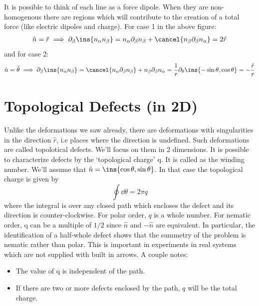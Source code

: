 It is possible to think of each line as a force dipole. When they are non-homogenous there are regions which will contribute to the creation of a total force (like electric dipoles and charge). For case 1 in the above figure:
\begin{align}
    \hat{n} = \hat{r} \implies \partial_\beta\ins{n_\alpha n_\beta} = n_\alpha\partial_\beta n_\beta + \cancel{n_\beta \partial_\beta n_\alpha} = 2\hat{r}
\end{align}
and for case 2:
\begin{align}
    \hat{n} = \hat{\theta} \implies \partial_\beta\ins{n_\alpha n_\beta} = \cancel{n_\alpha\partial_\beta n_\beta} + n_\beta\partial_\beta n_\alpha = \frac{1}{r}\partial_\theta\ins{-\sin\theta,\cos\theta} = -\frac{\hat{r}}{r}
\end{align}
\section{Topological Defects (in 2D)}
Unlike the deformations we saw already, there are deformations with singularities in the direction \(\hat{r}\), i.e places where the direction is undefined. Such deformations are called topolotical defects. We'll focus on them in 2 dimensions.
It is possible to characterize defects by the `topological charge' q. It is called as the winding number. We'll assume that \(\hat{n} = \ins{\cos\theta,\sin\theta}\). In that case the topological charge is given by
\begin{equation}
    \boxed{\oint\dd\theta = 2\pi q}
\end{equation}
where the integral is over any closed path which encloses the defect and its direction is counter-clockwise. For polar order, \(q\) is a whole number.
For nematic order, q can be a multiple of \(1/2\) since \(\hat{n}\) and \(-\hat{n}\) are equivalent. In particular, the identification of a half-whole defect shows that the summetry of the problem is nematic rather than polar. This is important in experiments in real systems which are not supplied with built in arrows. A couple notes:
\begin{itemize}
    \item The value of q is independent of the path.
    \item If there are two or more defects enclosed by the path, \(q\) will be the total charge.
\end{itemize}
